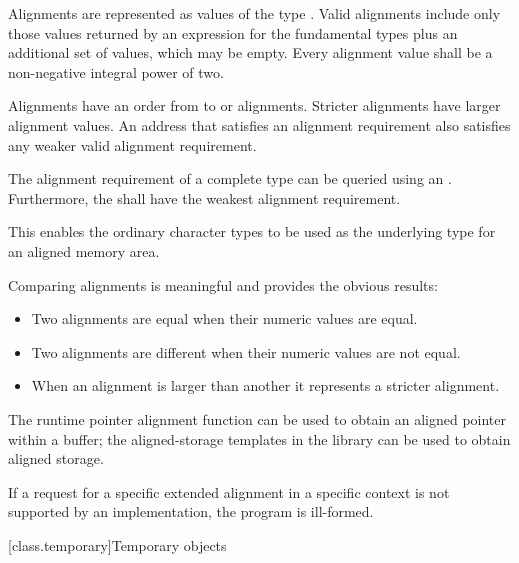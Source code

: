 \pnum
Alignments are represented as values of the type .
Valid alignments include only those values returned by an 
expression for the fundamental types plus an additional 
set of values, which may be empty.
Every alignment value shall be a non-negative integral power of two.

\pnum
Alignments have an order from  to
 or  alignments. Stricter
alignments have larger alignment values. An address that satisfies an alignment
requirement also satisfies any weaker valid alignment requirement.

\pnum
The alignment requirement of a complete type can be queried using an
. Furthermore,
the  shall have the weakest
alignment requirement.
\begin{note}
This enables the ordinary character types to be used as the
underlying type for an aligned memory area.
\end{note}

\pnum
Comparing alignments is meaningful and provides the obvious results:

\begin{itemize}
\item Two alignments are equal when their numeric values are equal.
\item Two alignments are different when their numeric values are not equal.
\item When an alignment is larger than another it represents a stricter alignment.
\end{itemize}

\pnum
\begin{note}
The runtime pointer alignment function
can be used to obtain an aligned pointer within a buffer; the aligned-storage templates
in the library can be used to obtain aligned storage.
\end{note}

\pnum
If a request for a specific extended alignment in a specific context is not
supported by an implementation, the program is ill-formed.

[class.temporary]{Temporary objects}

